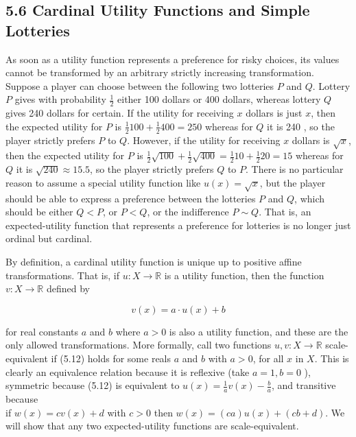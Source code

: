 \documentclass[12pt]{article}
\begin{document}
\subsection*{5.6 Cardinal Utility Functions and Simple Lotteries}
As soon as a utility function represents a preference for risky choices, its values cannot be transformed by an arbitrary strictly increasing transformation. Suppose a player can choose between the following two lotteries $P$ and $Q$. Lottery $P$ gives with probability $\frac{1}{2}$ either 100 dollars or 400 dollars, whereas lottery $Q$ gives 240 dollars for certain. If the utility for receiving $x$ dollars is just $x$, then the expected utility for $P$ is $\frac{1}{2} 100+\frac{1}{2} 400=250$ whereas for $Q$ it is 240 , so the player strictly prefers $P$ to $Q$. However, if the utility for receiving $x$ dollars is $\sqrt{x}$, then the expected utility for $P$ is $\frac{1}{2} \sqrt{100}+\frac{1}{2} \sqrt{400}=\frac{1}{2} 10+\frac{1}{2} 20=15$ whereas for $Q$ it is $\sqrt{240} \approx 15.5$, so the player strictly prefers $Q$ to $P$. There is no particular reason to assume a special utility function like $u(x)=\sqrt{x}$, but the player should be able to express a preference between the lotteries $P$ and $Q$, which should be either $Q<P$, or $P<Q$, or the indifference $P \sim Q$. That is, an expected-utility function that represents a preference for lotteries is no longer just ordinal but cardinal.

By definition, a cardinal utility function is unique up to positive affine transformations. That is, if $u: X \rightarrow \mathbb{R}$ is a utility function, then the function $v: X \rightarrow \mathbb{R}$ defined by


\begin{equation*}
v(x)=a \cdot u(x)+b \tag{5.12}
\end{equation*}


for real constants $a$ and $b$ where $a>0$ is also a utility function, and these are the only allowed transformations. More formally, call two functions $u, v: X \rightarrow \mathbb{R}$ scale-equivalent if (5.12) holds for some reals $a$ and $b$ with $a>0$, for all $x$ in $X$. This is clearly an equivalence relation because it is reflexive (take $a=1, b=0$ ), symmetric because (5.12) is equivalent to $u(x)=\frac{1}{a} v(x)-\frac{b}{a}$, and transitive because\\
if $w(x)=c v(x)+d$ with $c>0$ then $w(x)=(c a) u(x)+(c b+d)$. We will show that any two expected-utility functions are scale-equivalent.
\end{document}
